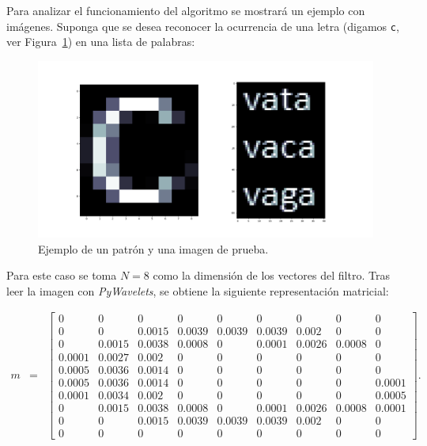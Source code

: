 \par Para analizar el funcionamiento del algoritmo se mostrar\'a un ejemplo con im\'agenes. Suponga que se desea reconocer la ocurrencia de una letra (digamos \texttt{c}, ver Figura~\ref{img-ejemplo}) en una lista de palabras:

\begin{figure}[h]
\center
\includegraphics[scale=.2]{Graphics/cWordList.png}
\caption{Ejemplo de un patr\'on y una imagen de prueba.}
\label{img-ejemplo}
\end{figure}

\par Para este caso se toma $N=8$ como la dimensi\'on de los vectores del filtro. Tras leer la imagen con \textit{PyWavelets}, se obtiene la siguiente representaci\'on matricial:
\begin{scriptsize}
\begin{eqnarray}
m&=&\left[\begin{array}{rrrrrrrrr}
0&0&0&0&0&0&0&0&0\\
0&0&0.0015&0.0039&0.0039&0.0039&0.002&0&0\\
0&0.0015&0.0038&0.0008&0&0.0001&0.0026&0.0008&0\\
0.0001&0.0027&0.002&0&0&0&0&0&0\\
0.0005&0.0036&0.0014&0&0&0&0&0&0\\
0.0005&0.0036&0.0014&0&0&0&0&0&0.0001\\
0.0001&0.0034&0.002&0&0&0&0&0&0.0005\\
0&0.0015&0.0038&0.0008&0&0.0001&0.0026&0.0008&0.0001\\
0&0&0.0015&0.0039&0.0039&0.0039&0.002&0&0\\
0&0&0&0&0&0&0&0&0
\end{array}\right].\nonumber
\end{eqnarray}
\end{scriptsize}

